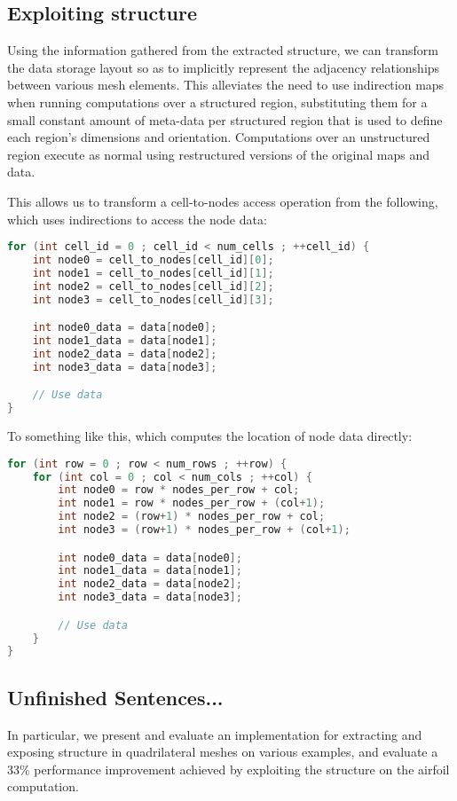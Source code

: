 \subsection{Exploiting structure}
Using the information gathered from the extracted structure, we can transform the data storage layout so as to implicitly represent the adjacency relationships between various mesh elements. This alleviates the need to use indirection maps when running computations over a structured region, substituting them for a small constant amount of meta-data per structured region that is used to define each region's dimensions and orientation. Computations over an unstructured region execute as normal using restructured versions of the original maps and data.

This allows us to transform a cell-to-nodes access operation from the following, which uses indirections to access the node data:
\begin{lstlisting}[language=c++]
for (int cell_id = 0 ; cell_id < num_cells ; ++cell_id) {
	int node0 = cell_to_nodes[cell_id][0];
	int node1 = cell_to_nodes[cell_id][1];
	int node2 = cell_to_nodes[cell_id][2];
	int node3 = cell_to_nodes[cell_id][3];

	int node0_data = data[node0];
	int node1_data = data[node1];
	int node2_data = data[node2];
	int node3_data = data[node3];

	// Use data
}
\end{lstlisting}

To something like this, which computes the location of node data directly:
\begin{lstlisting}[language=c++]
for (int row = 0 ; row < num_rows ; ++row) {
	for (int col = 0 ; col < num_cols ; ++col) {
		int node0 = row * nodes_per_row + col;
		int node1 = row * nodes_per_row + (col+1);
		int node2 = (row+1) * nodes_per_row + col;
		int node3 = (row+1) * nodes_per_row + (col+1);

		int node0_data = data[node0];
		int node1_data = data[node1];
		int node2_data = data[node2];
		int node3_data = data[node3];

		// Use data
	}
}
\end{lstlisting}


\subsection{Unfinished Sentences...}
In particular, we present and evaluate an implementation for extracting and exposing structure in quadrilateral meshes on various examples, and evaluate a 33\% performance improvement achieved by exploiting the structure on the airfoil computation.
